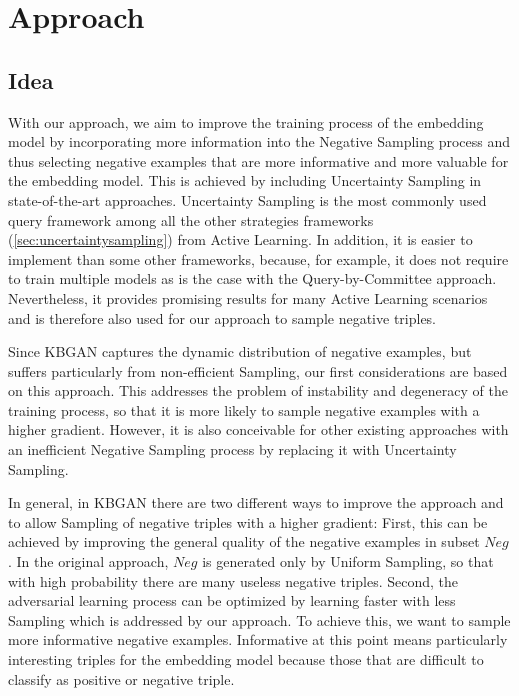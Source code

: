 \chapter{Approach}
\label{ch:approach}

\section{Idea} \label{sec:idea}



With our approach, we aim to improve the training process of the embedding model by incorporating more information into the Negative Sampling process and thus selecting negative examples that are more informative and more valuable for the embedding model.
This is achieved by including Uncertainty Sampling in state-of-the-art approaches.
Uncertainty Sampling is the most commonly used query framework among all the other strategies frameworks (\autoref{sec:uncertaintysampling}) from Active Learning.
In addition, it is easier to implement than some other frameworks, because, for example, it does not require to train multiple models as is the case with the Query-by-Committee approach.
Nevertheless, it provides promising results for many Active Learning scenarios and is therefore also used for our approach to sample negative triples.

Since \ac{KBGAN} captures the dynamic distribution of negative examples, but suffers particularly from non-efficient Sampling, our first considerations are based on this approach.
This addresses the problem of instability and degeneracy of the training process, so that it is more likely to sample negative examples with a higher gradient.
However, it is also conceivable for other existing approaches with an inefficient Negative Sampling process by replacing it with Uncertainty Sampling.

In general, in \ac{KBGAN} there are two different ways to improve the approach and to allow Sampling of negative triples with a higher gradient:
First, this can be achieved by improving the general quality of the negative examples in subset $Neg$.
In the original approach, $Neg$ is generated only by Uniform Sampling, so that with high probability there are many useless negative triples.
Second, the adversarial learning process can be optimized by learning faster with less Sampling which is addressed by our approach.
To achieve this, we want to sample more informative negative examples.
Informative at this point means particularly interesting triples for the embedding model because those that are difficult to classify as positive or negative triple.

